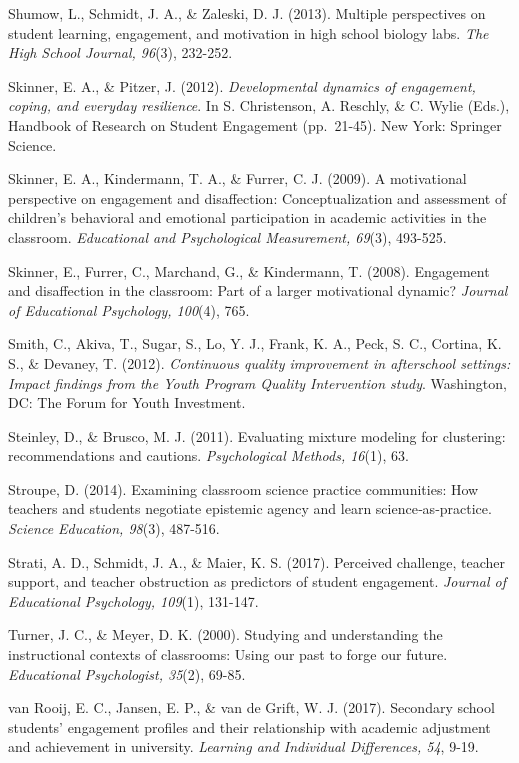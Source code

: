 \documentclass[]{msu-thesis}
\theoremstyle{definition}
\theoremstyle{definition}
\theoremstyle{definition}
\theoremstyle{remark}
\begin{document}
Shumow, L., Schmidt, J. A., \& Zaleski, D. J. (2013). Multiple
perspectives on student learning, engagement, and motivation in high
school biology labs. \emph{The High School Journal, 96}(3), 232-252.

Skinner, E. A., \& Pitzer, J. (2012). \emph{Developmental dynamics of
engagement, coping, and everyday resilience}. In S. Christenson, A.
Reschly, \& C. Wylie (Eds.), Handbook of Research on Student Engagement
(pp.~21-45). New York: Springer Science.

Skinner, E. A., Kindermann, T. A., \& Furrer, C. J. (2009). A
motivational perspective on engagement and disaffection:
Conceptualization and assessment of children's behavioral and emotional
participation in academic activities in the classroom. \emph{Educational
and Psychological Measurement, 69}(3), 493-525.

Skinner, E., Furrer, C., Marchand, G., \& Kindermann, T. (2008).
Engagement and disaffection in the classroom: Part of a larger
motivational dynamic? \emph{Journal of Educational Psychology, 100}(4),
765.

Smith, C., Akiva, T., Sugar, S., Lo, Y. J., Frank, K. A., Peck, S. C.,
Cortina, K. S., \& Devaney, T. (2012). \emph{Continuous quality
improvement in afterschool settings: Impact findings from the Youth
Program Quality Intervention study}. Washington, DC: The Forum for Youth
Investment.

Steinley, D., \& Brusco, M. J. (2011). Evaluating mixture modeling for
clustering: recommendations and cautions. \emph{Psychological Methods,
16}(1), 63.

Stroupe, D. (2014). Examining classroom science practice communities:
How teachers and students negotiate epistemic agency and learn
science‐as‐practice. \emph{Science Education, 98}(3), 487-516.

Strati, A. D., Schmidt, J. A., \& Maier, K. S. (2017). Perceived
challenge, teacher support, and teacher obstruction as predictors of
student engagement. \emph{Journal of Educational Psychology, 109}(1),
131-147.

Turner, J. C., \& Meyer, D. K. (2000). Studying and understanding the
instructional contexts of classrooms: Using our past to forge our
future. \emph{Educational Psychologist, 35}(2), 69-85.

van Rooij, E. C., Jansen, E. P., \& van de Grift, W. J. (2017).
Secondary school students' engagement profiles and their relationship
with academic adjustment and achievement in university. \emph{Learning
and Individual Differences, 54}, 9-19.
\end{document}
